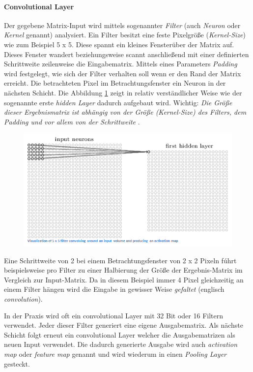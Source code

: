 \paragraph{Convolutional Layer}
Der gegebene Matrix-Input wird mittels sogenannter \emph{Filter} (auch \emph{Neuron} oder \emph{Kernel} genannt) analysiert. Ein Filter besitzt eine feste Pixelgröße (\emph{Kernel-Size}) wie zum Beispiel 5 x 5. Diese spannt ein kleines \glqq Fenster\grqq  über der Matrix auf. Dieses Fenster wandert beziehungsweise scannt anschließend mit einer definierten Schrittweite zeilenweise die Eingabematrix. Mittels eines Parameters \emph{Padding} wird festgelegt, wie sich der Filter verhalten soll wenn er den Rand der Matrix erreicht. Die betrachteten Pixel im Betrachtungsfenster ein Neuron in der nächsten Schicht. Die Abbildung \ref{fig:cnn_convLayer} zeigt in relativ verständlicher Weise wie der sogenannte erste \emph{hidden Layer} dadurch aufgebaut wird. Wichtig: \emph{Die Größe dieser Ergebnismatrix ist abhängig von der Größe (Kernel-Size) des Filters, dem Padding und vor allem von der Schrittweite} \cite{cnnFunktionsweise2}. 

\begin{figure}[!htb]
	\centering
	\includegraphics[width=.6\linewidth]{img/cnn_convLayer}
	\label{fig:cnn_convLayer}
\end{figure}

Eine Schrittweite von 2 bei einem Betrachtungsfenster von 2 x 2 Pixeln fúhrt beispielsweise pro Filter zu einer Halbierung der Größe der Ergebnis-Matrix im Vergleich zur Input-Matrix. Da in diesem Beispiel immer 4 Pixel gleichzeitig an einem Filter hängen wird die Eingabe in gewisser Weise \emph{gefaltet} (englisch \emph{convolution}). 

In der Praxis wird oft ein convolutional Layer mit 32 Bit oder 16 Filtern verwendet. Jeder dieser Filter generiert eine eigene Ausgabematrix. Als nächste Schicht folgt erneut ein convolutional Layer welcher die Ausgabematrizen als neuen Input verwendet. Die dadurch generierte Ausgabe wird auch \emph{activation map} oder \emph{feature map} genannt und wird wiederum in einen \emph{Pooling Layer} gesteckt. 

